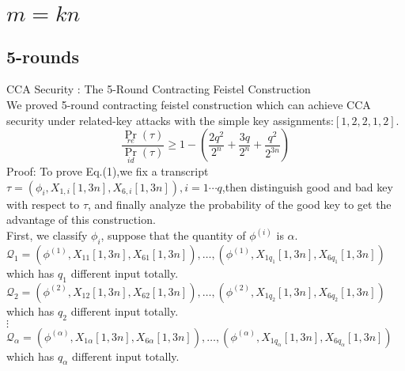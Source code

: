 \date{Received: date / Accepted: date}


\maketitle

\begin{abstract}
%	

\end{abstract}



%
%
%



\section{$m=kn$}
\subsection{5-rounds}
CCA Security : The 5-Round Contracting Feistel Construction\\
We proved 5-round contracting feistel construction which can achieve CCA security under related-key attacks with the simple key assignments:$[1,2,2,1,2]$.\\
\begin{equation}
\frac{\Pr_{re}(\tau)}{\Pr_{id}(\tau)}\geq 1-( \frac{2q^{2}}{2^{n}}+\frac{3q}{2^{n}} +\frac{q^{2}}{2^{3n}})
\end{equation}
Proof:
To prove Eq.(1),we fix a transcript $\tau=(\phi_{i},X_{1,i}[1,3n],X_{6,i}[1,3n]),i=1\cdots q$,then distinguish good and bad key with respect to $\tau$, and finally analyze the probability of the good key to get the advantage of this construction.\\

First, we classify $\phi_{i}$, suppose that the quantity of $\phi^{(i)}$ is $\alpha$.\\
$\mathcal{Q}_{1}={(\phi^{(1)},X_{11}[1,3n],X_{61}[1,3n]),\dots,(\phi^{(1)},X_{1q_{1}}[1,3n],X_{6q_{1}}[1,3n])}$ which has $q_{1}$ different input totally.\\
$\mathcal{Q}_{2}={(\phi^{(2)},X_{12}[1,3n],X_{62}[1,3n]),\dots,(\phi^{(2)},X_{1q_{2}}[1,3n],X_{6q_{2}}[1,3n])}$    which has $q_{2}$ different input totally.\\
\quad \quad $\vdots$ \\
$\mathcal{Q}_{\alpha}={(\phi^{(\alpha)},X_{1\alpha}[1,3n],X_{6\alpha}[1,3n]),\dots,(\phi^{(\alpha)},X_{1q_{\alpha}}[1,3n],X_{6q_{\alpha}}[1,3n])}$ which has $q_{\alpha}$ different input totally.\\

